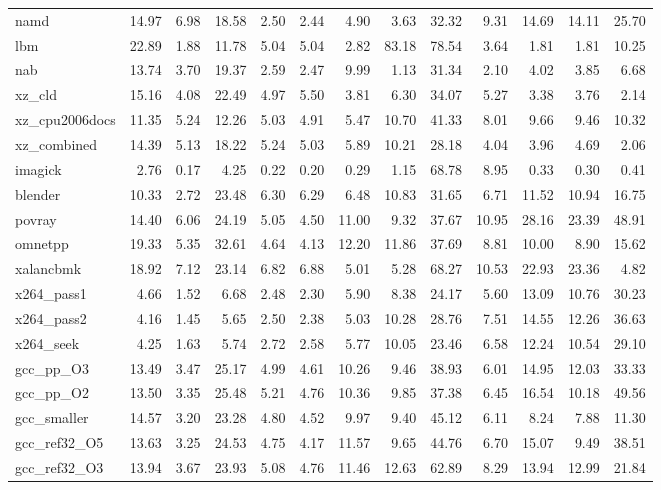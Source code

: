 \documentclass[10pt,a4paper]{article}
\begin{document}
{\begin{longtable}{@{}lrrrrrrrrrrrr@{}}
namd & 14.97 & 6.98 & 18.58 & 2.50 & 2.44 & 4.90 & 3.63 & 32.32 & 9.31 & 14.69 & 14.11 & 25.70 \\
lbm & 22.89 & 1.88 & 11.78 & 5.04 & 5.04 & 2.82 & 83.18 & 78.54 & 3.64 & 1.81 & 1.81 & 10.25 \\
nab & 13.74 & 3.70 & 19.37 & 2.59 & 2.47 & 9.99 & 1.13 & 31.34 & 2.10 & 4.02 & 3.85 & 6.68 \\
xz\_cld & 15.16 & 4.08 & 22.49 & 4.97 & 5.50 & 3.81 & 6.30 & 34.07 & 5.27 & 3.38 & 3.76 & 2.14 \\
xz\_cpu2006docs & 11.35 & 5.24 & 12.26 & 5.03 & 4.91 & 5.47 & 10.70 & 41.33 & 8.01 & 9.66 & 9.46 & 10.32 \\
xz\_combined & 14.39 & 5.13 & 18.22 & 5.24 & 5.03 & 5.89 & 10.21 & 28.18 & 4.04 & 3.96 & 4.69 & 2.06 \\
imagick & 2.76 & 0.17 & 4.25 & 0.22 & 0.20 & 0.29 & 1.15 & 68.78 & 8.95 & 0.33 & 0.30 & 0.41 \\
blender & 10.33 & 2.72 & 23.48 & 6.30 & 6.29 & 6.48 & 10.83 & 31.65 & 6.71 & 11.52 & 10.94 & 16.75 \\
povray & 14.40 & 6.06 & 24.19 & 5.05 & 4.50 & 11.00 & 9.32 & 37.67 & 10.95 & 28.16 & 23.39 & 48.91 \\
omnetpp & 19.33 & 5.35 & 32.61 & 4.64 & 4.13 & 12.20 & 11.86 & 37.69 & 8.81 & 10.00 & 8.90 & 15.62 \\
xalancbmk & 18.92 & 7.12 & 23.14 & 6.82 & 6.88 & 5.01 & 5.28 & 68.27 & 10.53 & 22.93 & 23.36 & 4.82 \\
x264\_pass1 & 4.66 & 1.52 & 6.68 & 2.48 & 2.30 & 5.90 & 8.38 & 24.17 & 5.60 & 13.09 & 10.76 & 30.23 \\
x264\_pass2 & 4.16 & 1.45 & 5.65 & 2.50 & 2.38 & 5.03 & 10.28 & 28.76 & 7.51 & 14.55 & 12.26 & 36.63 \\
x264\_seek & 4.25 & 1.63 & 5.74 & 2.72 & 2.58 & 5.77 & 10.05 & 23.46 & 6.58 & 12.24 & 10.54 & 29.10 \\
gcc\_pp\_O3 & 13.49 & 3.47 & 25.17 & 4.99 & 4.61 & 10.26 & 9.46 & 38.93 & 6.01 & 14.95 & 12.03 & 33.33 \\
gcc\_pp\_O2 & 13.50 & 3.35 & 25.48 & 5.21 & 4.76 & 10.36 & 9.85 & 37.38 & 6.45 & 16.54 & 10.18 & 49.56 \\
gcc\_smaller & 14.57 & 3.20 & 23.28 & 4.80 & 4.52 & 9.97 & 9.40 & 45.12 & 6.11 & 8.24 & 7.88 & 11.30 \\
gcc\_ref32\_O5 & 13.63 & 3.25 & 24.53 & 4.75 & 4.17 & 11.57 & 9.65 & 44.76 & 6.70 & 15.07 & 9.49 & 38.51 \\
gcc\_ref32\_O3 & 13.94 & 3.67 & 23.93 & 5.08 & 4.76 & 11.46 & 12.63 & 62.89 & 8.29 & 13.94 & 12.99 & 21.84 \\

\end{longtable}}
\end{document}
